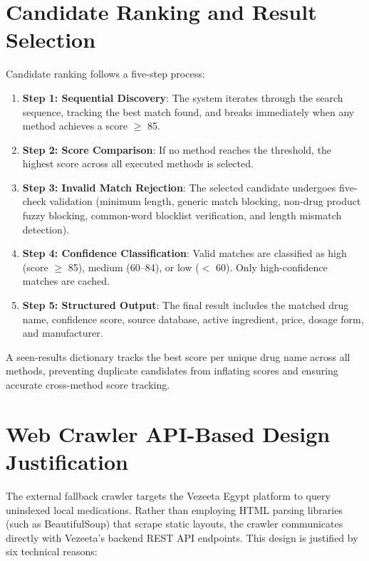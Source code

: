 \documentclass[12pt,a4paper,oneside]{report}
\begin{document}
\section{Candidate Ranking and Result Selection}\label{candidate-ranking-and-result-selection}
Candidate ranking follows a five-step process:
\begin{enumerate}
\def\labelenumi{\arabic{enumi})}
\item
  \textbf{Step 1: Sequential Discovery}: The system iterates through the search sequence, tracking the best match found, and breaks immediately when any method achieves a score $\ge$ 85.
\item
  \textbf{Step 2: Score Comparison}: If no method reaches the threshold, the highest score across all executed methods is selected.
\item
  \textbf{Step 3: Invalid Match Rejection}: The selected candidate undergoes five-check validation (minimum length, generic match blocking, non-drug product fuzzy blocking, common-word blocklist verification, and length mismatch detection).
\item
  \textbf{Step 4: Confidence Classification}: Valid matches are classified as high (score $\ge$ 85), medium (60--84), or low ($<$ 60). Only high-confidence matches are cached.
\item
  \textbf{Step 5: Structured Output}: The final result includes the matched drug name, confidence score, source database, active ingredient, price, dosage form, and manufacturer.
\end{enumerate}

A seen-results dictionary tracks the best score per unique drug name across all methods, preventing duplicate candidates from inflating scores and ensuring accurate cross-method score tracking.

\section{Web Crawler API-Based Design
Justification}\label{web-crawler-api-based-design-justification}

The external fallback crawler targets the Vezeeta Egypt platform to
query unindexed local medications. Rather than employing HTML parsing
libraries (such as BeautifulSoup) that scrape static layouts, the
crawler communicates directly with Vezeeta's backend REST API endpoints.
This design is justified by six technical reasons:
\end{document}
